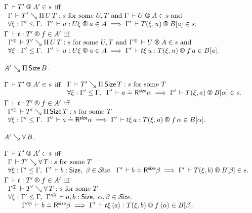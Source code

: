 \documentclass[acmlarge,review,anonymous]{acmart}\settopmatter{printfolios=true}
\begin{document}
\begin{caselist}
\noindent
$\LRTS \Gamma {T'} {A'} s$ iff
\(
\begin{array}[t]{l}
\Gamma \der T' \evalsto \piT U T : s \mforsome U, T \mand \LRTS \Gamma U A s \mand \\
\forall \xi : \Gamma' \leq \Gamma.\ \
\LR {\Gamma'} u {U\xi} a A \implies \LRTS {\Gamma'} {T(\xi,u)} {B[a]} s
. \\
\end{array}
\) \\
$\LR \Gamma t {T'} f {A'}$ iff
\(
\begin{array}[t]{l}
\resurrect\Gamma \der T' \evalsto \piT U T : s \mforsome U, T \mand \LRTS {\resurrect\Gamma} U A s \mand \\
\forall \xi : \Gamma' \leq \Gamma.\ \
\LR {\Gamma'} u {U\xi} a A \implies \LR {\Gamma'} {t\xi\,u} {T(\xi,u)} {f\,a} {B[a]}
.
\end{array}
\)

\vspace{2ex}
\nextcase $A' \searrow \Pi\,\mathsf{Size}\, B$.

\noindent
$\LRTS \Gamma {T'} {A'} s$ iff
\(
\begin{array}[t]{l}
\Gamma \der T' \evalsto \piT \Size T : s \mforsome T\\
\forall \xi : \Gamma' \leq \Gamma.\ \
\LRSize {\Gamma'} a \alpha
\implies \LRTS {\Gamma'} {T(\xi,a)} {B[\alpha]} s
.
\end{array}
\) \\
$\LR \Gamma t {T'} f {A'}$ iff
\(
\begin{array}[t]{l}
\resurrect\Gamma \der T' \evalsto \piT \Size T : s \mforsome T\\
\forall \xi : \Gamma' \leq \Gamma.\ \
\LRSize {\Gamma'} a \alpha
\implies \LR {\Gamma'} {t\xi\,a} {T(\xi,a)} {f\,\alpha} {B[\alpha]}
.
\end{array}
\)

\vspace{2ex}
\nextcase $A' \searrow \forall\, B$.

\noindent
$\LRTS \Gamma {T'} {A'} s$ iff
\(
\begin{array}[t]{l}
\Gamma \der T' \evalsto \forallT T : s \mforsome T\\
\forall \xi : \Gamma' \leq \Gamma,\
{\Gamma'} \der b : \Size,\
\beta \in \SIZE. \ \
\LRSize {\Gamma'} b \beta
\implies \LRTS {\Gamma'} {T(\xi,b)} {B[\beta]} s
.
\end{array}
\) \\
$\LR \Gamma t {T'} f {A'}$ iff
\(
\begin{array}[t]{l}
\resurrect\Gamma \der T' \evalsto \forallT T : s \mforsome T\\
\forall \xi : \Gamma' \leq \Gamma,\
\resurrect{\Gamma'} \der a,b : \Size,\
\alpha,\beta \in \SIZE. \ \\ \qquad
\LRSize {\resurrect{\Gamma'}} b \beta
\implies \LR {\Gamma'} {t\xi\,\ann a} {T(\xi,b)} {f\,\ann\alpha} {B[\beta]}
.
\end{array}
\)
\end{caselist}
\end{document}
